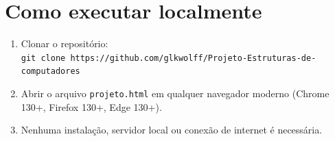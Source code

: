 \section{Como executar localmente}

\begin{enumerate}
    \item Clonar o repositório: \\
          \texttt{git clone https://github.com/glkwolff/Projeto-Estruturas-de-computadores}
    \item Abrir o arquivo \texttt{projeto.html} em qualquer navegador
          moderno (Chrome 130+, Firefox 130+, Edge 130+).
    \item Nenhuma instalação, servidor local ou conexão de internet é
          necessária.
\end{enumerate}
